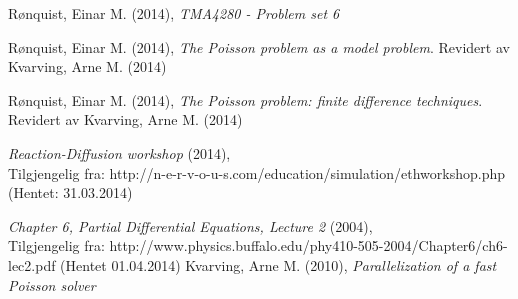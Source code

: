 \begin{thebibliography}{9}

	Rønquist, Einar M. (2014),
	\emph{TMA4280 - Problem set 6}

	Rønquist, Einar M. (2014),
	\emph{The Poisson problem as a model problem}.
	Revidert av Kvarving, Arne M. (2014)

	Rønquist, Einar M. (2014),
	\emph{The Poisson problem: finite difference techniques}.
	Revidert av Kvarving, Arne M. (2014)

	\emph{Reaction-Diffusion workshop} (2014),\\
	Tilgjengelig fra: http://n-e-r-v-o-u-s.com/education/simulation/ethworkshop.php
	(Hentet: 31.03.2014)

	\emph{Chapter 6, Partial Differential Equations, Lecture 2} (2004),\\
	Tilgjengelig fra: http://www.physics.buffalo.edu/phy410-505-2004/Chapter6/ch6-lec2.pdf
	(Hentet 01.04.2014)
	Kvarving, Arne M. (2010),
	\emph{Parallelization of a fast Poisson solver}
\end{thebibliography}
